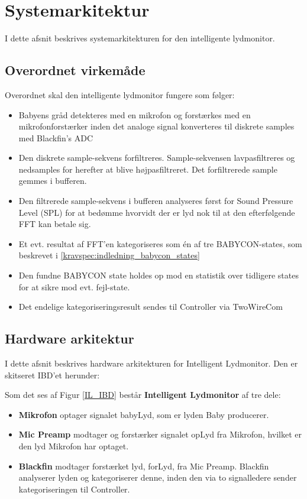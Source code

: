 \newpage
\section{Systemarkitektur}

I dette afsnit beskrives systemarkitekturen for den intelligente lydmonitor.

\subsection*{Overordnet virkemåde}
Overordnet skal den intelligente lydmonitor fungere som følger:
\begin{itemize}
	\item Babyens gråd detekteres med en mikrofon og forstærkes med en mikrofonforstærker inden det analoge signal konverteres til diskrete samples med Blackfin's ADC
	\item Den diskrete sample-sekvens forfiltreres. Sample-sekvensen lavpasfiltreres og nedsamples for herefter at blive højpasfiltreret. Det forfiltrerede sample gemmes i bufferen.
	\item Den filtrerede sample-sekvens i bufferen analyseres først for Sound Pressure Level (SPL) for at bedømme hvorvidt der er lyd nok til at den efterfølgende FFT kan betale sig. 
	\item Et evt. resultat af FFT'en kategoriseres som én af tre BABYCON-states, som beskrevet i \ref{kravspec:indledning_babycon_states} 
	\item Den fundne BABYCON state holdes op mod en statistik over tidligere states for at sikre mod evt. fejl-state.
	\item Det endelige kategoriseringsresult sendes til Controller via TwoWireCom
\end{itemize}


\newpage
\subsection{Hardware arkitektur}
I dette afsnit beskrives hardware arkitekturen for Intelligent Lydmonitor. Den er skitseret IBD'et herunder:

Som det ses af Figur \ref{IL_IBD} består \textbf{Intelligent Lydmonitor} af tre dele: 
\begin{itemize}
\item \textbf{Mikrofon} optager signalet babyLyd, som er lyden Baby producerer. 
\item \textbf{Mic Preamp} modtager og forstærker signalet opLyd fra Mikrofon, hvilket er den lyd Mikrofon har optaget. 
\item \textbf{Blackfin} modtager forstærket lyd, forLyd, fra Mic Preamp. Blackfin analyserer lyden og kategoriserer denne, inden den via to signalledere sender kategoriseringen til Controller. 
\end{itemize}

